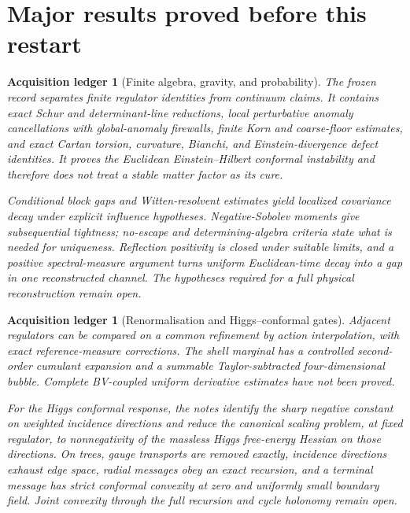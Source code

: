 \documentclass[11pt]{article}
\newtheorem{ledger}[theorem]{Acquisition ledger}
\theoremstyle{remark}
\begin{document}
\section{Major results proved before this restart}
\label{sec:v19v1-summary}

\begin{ledger}[Finite algebra, gravity, and probability]
\label{led:v19v1-legacy}
The frozen record separates finite regulator identities from continuum
claims.  It contains exact Schur and determinant-line reductions, local
perturbative anomaly cancellations with global-anomaly firewalls, finite
Korn and coarse-floor estimates, and exact Cartan torsion, curvature,
Bianchi, and Einstein-divergence defect identities.  It proves the
Euclidean Einstein--Hilbert conformal instability and therefore does not
treat a stable matter factor as its cure.

Conditional block gaps and Witten-resolvent estimates yield localized
covariance decay under explicit influence hypotheses.  Negative-Sobolev
moments give subsequential tightness; no-escape and determining-algebra
criteria state what is needed for uniqueness.  Reflection positivity is
closed under suitable limits, and a positive spectral-measure argument
turns uniform Euclidean-time decay into a gap in one reconstructed channel.
The hypotheses required for a full physical reconstruction remain open.
\end{ledger}

\begin{ledger}[Renormalisation and Higgs--conformal gates]
\label{led:v19v1-renormalisation}
Adjacent regulators can be compared on a common refinement by action
interpolation, with exact reference-measure corrections.  The shell
marginal has a controlled second-order cumulant expansion and a summable
Taylor-subtracted four-dimensional bubble.  Complete BV-coupled uniform
derivative estimates have not been proved.

For the Higgs conformal response, the notes identify the sharp negative
constant on weighted incidence directions and reduce the canonical scaling
problem, at fixed regulator, to nonnegativity of the massless Higgs
free-energy Hessian on those directions.  On trees, gauge transports are
removed exactly, incidence directions exhaust edge space, radial messages
obey an exact recursion, and a terminal message has strict conformal
convexity at zero and uniformly small boundary field.  Joint convexity
through the full recursion and cycle holonomy remain open.
\end{ledger}
\end{document}
